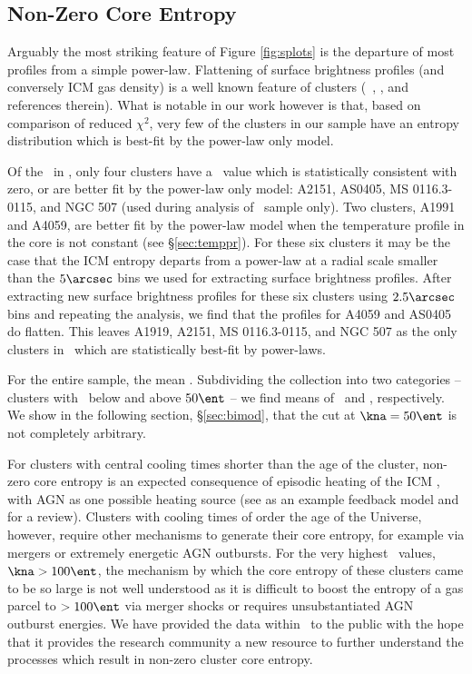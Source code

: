 \documentclass{emulateapj}
\begin{document}
\subsection{Non-Zero Core Entropy}
\label{sec:nonzerok0}

Arguably the most striking feature of Figure \ref{fig:splots} is the
departure of most profiles from a simple power-law. Flattening of
surface brightness profiles (and conversely ICM gas density) is a well
known feature of clusters (\eg\ \citealt{1999ApJ...517..627M},
\citealt{2000MNRAS.318..715X}, and references therein). What is
notable in our work however is that, based on comparison of reduced
$\chi^2$, very few of the clusters in our sample have an entropy
distribution which is best-fit by the power-law only model.

Of the \numcluster\ in \accept, only four clusters have a \kna\ value
which is statistically consistent with zero, or are better fit by the
power-law only model: A2151, AS0405, MS 0116.3-0115, and NGC 507 (used
during analysis of \hifl\ sample only). Two clusters, A1991 and A4059,
are better fit by the power-law model when the temperature profile in
the core is not constant (see \S\ref{sec:temppr}). For these six
clusters it may be the case that the ICM entropy departs from a
power-law at a radial scale smaller than the $5\arcsec$ bins we used
for extracting surface brightness profiles. After extracting new
surface brightness profiles for these six clusters using $2.5\arcsec$
bins and repeating the analysis, we find that the profiles for A4059
and AS0405 do flatten. This leaves A1919, A2151, MS 0116.3-0115, and
NGC 507 as the only clusters in \accept\ which are statistically
best-fit by power-laws.

For the entire sample, the mean \knafs. Subdividing the collection
into two categories -- clusters with \kna\ below and above $50 \ent$
-- we find means of \knaga\ and \knagb, respectively. We show in the
following section, \S\ref{sec:bimod}, that the cut at $\kna=50
\ent$ is not completely arbitrary.

For clusters with central cooling times shorter than the age of the
cluster, non-zero core entropy is an expected consequence of episodic
heating of the ICM \citep{2001ApJ...557..546D, kaiser03}, with AGN as
one possible heating source (see \citealt{agnframework} as an example
feedback model and \citealt{mcnamrev} for a review). Clusters with
cooling times of order the age of the Universe, however, require other
mechanisms to generate their core entropy, for example via mergers or
extremely energetic AGN outbursts. For the very highest \kna\ values,
$\kna > 100 \ent$, the mechanism by which the core entropy of these
clusters came to be so large is not well understood as it is difficult
to boost the entropy of a gas parcel to $> 100 \ent$ via merger shocks
\citep{2008MNRAS.386.1309M} or requires unsubstantiated AGN outburst
energies. We have provided the data within \accept\ to the public with
the hope that it provides the research community a new resource to
further understand the processes which result in non-zero cluster core
entropy.
\end{document}
